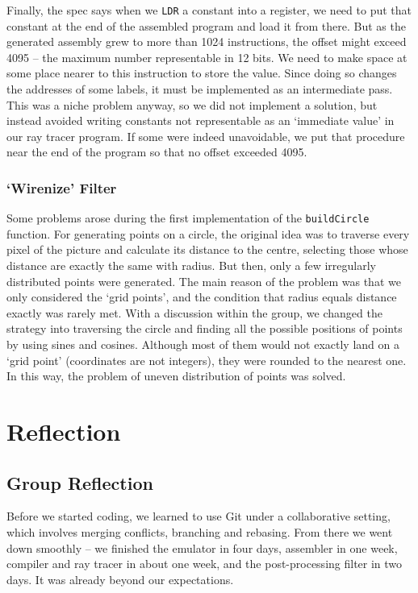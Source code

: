 \documentclass[11pt]{article}
\newcommand{\codeword}[1]{\texttt{#1}}
\begin{document}
Finally, the spec says when we \codeword{LDR} a constant into a register, we need to put that constant at the end of the assembled program and load it from there. But as the generated assembly grew to more than 1024 instructions, the offset might exceed 4095 – the maximum number representable in 12 bits. We need to make space at some place nearer to this instruction to store the value. Since doing so changes the addresses of some labels, it must be implemented as an intermediate pass. This was a niche problem anyway, so we did not implement a solution, but instead avoided writing constants not representable as an ‘immediate value’ in our ray tracer program. If some were indeed unavoidable, we put that procedure near the end of the program so that no offset exceeded 4095.

\subsubsection{‘Wirenize’ Filter}

Some problems arose during the first implementation of the \codeword{buildCircle} function. For generating points on a circle, the original idea was to traverse every pixel of the picture and calculate its distance to the centre, selecting those whose distance are exactly the same with radius. But then, only a few irregularly distributed points were generated. The main reason of the problem was that we only considered the ‘grid points’, and the condition that radius equals distance exactly was rarely met. With a discussion within the group, we changed the strategy into traversing the circle and finding all the possible positions of points by using sines and cosines. Although most of them would not exactly land on a ‘grid point' (coordinates are not integers), they were rounded to the nearest one. In this way, the problem of uneven distribution of points was solved.

\section{Reflection}

\subsection{Group Reflection}

Before we started coding, we learned to use Git under a collaborative setting, which involves merging conflicts, branching and rebasing. From there we went down smoothly – we finished the emulator in four days, assembler in one week, compiler and ray tracer in about one week, and the post-processing filter in two days. It was already beyond our expectations.
\end{document}
